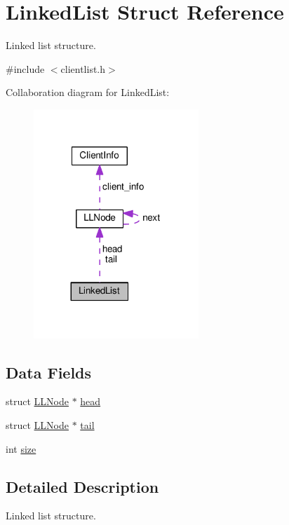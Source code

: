 \hypertarget{structLinkedList}{}\section{Linked\+List Struct Reference}
\label{structLinkedList}


Linked list structure.  




{\ttfamily \#include $<$clientlist.\+h$>$}



Collaboration diagram for Linked\+List\+:\nopagebreak
\begin{figure}[H]
\begin{center}
\leavevmode
\includegraphics[width=176pt]{structLinkedList__coll__graph}
\end{center}
\end{figure}
\subsection*{Data Fields}
\begin{DoxyCompactItemize}
\item 
struct \hyperlink{structLLNode}{L\+L\+Node} $\ast$ \hyperlink{structLinkedList_a6bcf92a302661a0ef84d2ce766b73136}{head}
\item 
struct \hyperlink{structLLNode}{L\+L\+Node} $\ast$ \hyperlink{structLinkedList_a18d79a06868a03b79f30ebf650f7379d}{tail}
\item 
int \hyperlink{structLinkedList_a4c3f611f9904b8b0f10a374426e59b5d}{size}
\end{DoxyCompactItemize}


\subsection{Detailed Description}
Linked list structure. 


